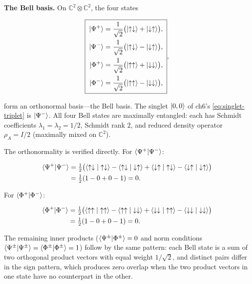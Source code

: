 \medskip\noindent\textbf{The Bell basis.}
On $\mathbb{C}^2 \otimes \mathbb{C}^2$, the four states
\begin{linenomath}
\begin{equation}
\boxed{\;
\begin{aligned}
\ket{\Psi^+} &= \frac{1}{\sqrt{2}}\bigl(\ket{\uparrow\downarrow} + \ket{\downarrow\uparrow}\bigr), \\
\ket{\Psi^-} &= \frac{1}{\sqrt{2}}\bigl(\ket{\uparrow\downarrow} - \ket{\downarrow\uparrow}\bigr), \\
\ket{\Phi^+} &= \frac{1}{\sqrt{2}}\bigl(\ket{\uparrow\uparrow} + \ket{\downarrow\downarrow}\bigr), \\
\ket{\Phi^-} &= \frac{1}{\sqrt{2}}\bigl(\ket{\uparrow\uparrow} - \ket{\downarrow\downarrow}\bigr),
\end{aligned}
\;},
\label{eq:bell-states}
\end{equation}
\end{linenomath}
form an orthonormal basis---the Bell basis. The singlet $\ket{0,0}$ of ch6's \eqref{eq:singlet-triplet} is $\ket{\Psi^-}$. All four Bell states are maximally entangled: each has Schmidt coefficients $\lambda_1 = \lambda_2 = 1/2$, Schmidt rank $2$, and reduced density operator $\rho_A = I/2$ (maximally mixed on $\mathbb{C}^2$).

The orthonormality is verified directly. For $\braket{\Psi^+|\Psi^-}$:
\begin{linenomath}
\begin{align}
\braket{\Psi^+|\Psi^-}
&= \tfrac12\bigl(\braket{\uparrow\downarrow|\uparrow\downarrow} - \braket{\uparrow\downarrow|\downarrow\uparrow} + \braket{\downarrow\uparrow|\uparrow\downarrow} - \braket{\downarrow\uparrow|\downarrow\uparrow}\bigr) \\
&= \tfrac12(1 - 0 + 0 - 1) = 0.
\end{align}
\end{linenomath}
For $\braket{\Phi^+|\Phi^-}$:
\begin{linenomath}
\begin{align}
\braket{\Phi^+|\Phi^-}
&= \tfrac12\bigl(\braket{\uparrow\uparrow|\uparrow\uparrow} - \braket{\uparrow\uparrow|\downarrow\downarrow} + \braket{\downarrow\downarrow|\uparrow\uparrow} - \braket{\downarrow\downarrow|\downarrow\downarrow}\bigr) \\
&= \tfrac12(1 - 0 + 0 - 1) = 0.
\end{align}
\end{linenomath}
The remaining inner products ($\braket{\Psi^\pm|\Phi^\pm} = 0$ and norm conditions $\braket{\Psi^\pm|\Psi^\pm} = \braket{\Phi^\pm|\Phi^\pm} = 1$) follow by the same pattern: each Bell state is a sum of two orthogonal product vectors with equal weight $1/\sqrt{2}$, and distinct pairs differ in the sign pattern, which produces zero overlap when the two product vectors in one state have no counterpart in the other.

